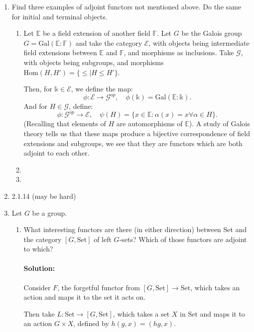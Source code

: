 \documentclass{article}
\begin{document}
\begin{enumerate} 
    \item Find three examples of adjoint functors not mentioned above. Do the same for initial and terminal objects.
        \begin{enumerate}
            \item Let $\mathbb{E}$ be a field extension of another field $\mathbb{F}$. Let $G$ be the Galois group $G=\mathrm{Gal}(\mathbb{E}:\mathbb{F})$ and take the category $\mathcal{E}$, with objects being intermediate field extensions between $\mathbb{E}$ and $\mathbb{F}$, and morphisms as inclusions. Take $\mathcal{G}$, with objects being subgroups, and morphisms $\mathrm{Hom}(H,H')=\{\leq |H\leq H'\} $.
                
                Then, for $\mathbb{k}\in \mathcal{E}$, we define the map:
                \[
                \phi:\mathcal{E}\to \mathcal{G}^{op},\quad\phi(\mathbb{k})= \mathrm{Gal}(\mathbb{E}:\mathbb{k})
                .\] 
                And for $H\in \mathcal{G}$, define:
                \[
                \phi:\mathcal{G}^{op}\to \mathcal{E},\quad\psi(H)=\{x\in \mathbb{E}:\alpha(x)=x\forall \alpha\in H\} 
                .\] 
                (Recalling that elements of $H$ are automorphisms of $\mathbb{E}$).
                A study of Galois theory tells us that these maps produce a bijective correspondence of field extensions and subgroups, we see that they are functors which are both adjoint to each other.
            \item 
            \item 
        \end{enumerate}
    \item 2.1.14 (may be hard)

    \item Let $G$ be a group.
        \begin{enumerate}
            \item What interesting functors are there (in either direction) between $\mathrm{Set}$ and the category $[G, \mathrm{Set} ]$ of left $G$-sets? Which of those functors are adjoint to which?
                \paragraph{Solution: } Consider $F$, the forgetful functor from $[G,\mathrm{Set}]\to \mathrm{Set}$, which takes an action and maps it to the set it acts on.

                Then take $L:\mathrm{Set}\to [G,\mathrm{Set}]$, which takes a set $X$ in $\mathrm{Set}$ and maps it to an action $G\times X$, defined by $h(g,x)=(hg,x)$.


\end{enumerate}
\end{enumerate}
\end{document}
